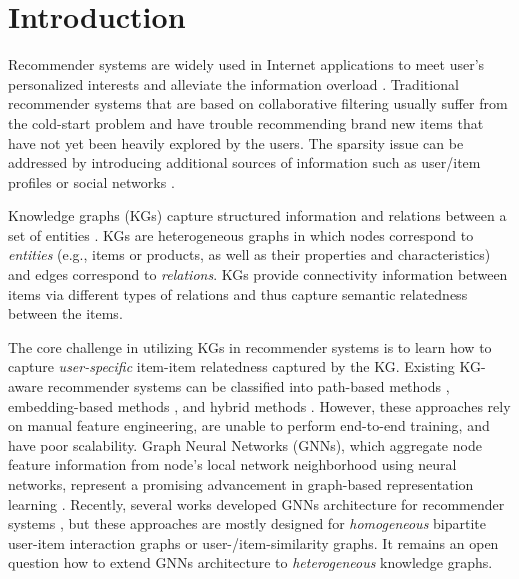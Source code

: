 \documentclass[sigconf]{acmart}
\begin{document}

\maketitle

\section{Introduction}
    Recommender systems are widely used in Internet applications to meet user's personalized interests and alleviate the information overload \cite{covington2016deep, wang2018billion, ying2018graph}.
	Traditional recommender systems that are based on collaborative filtering \cite{koren2009matrix,wang2017joint} usually suffer from the cold-start problem and have trouble recommending brand new items that have not yet been heavily explored by the users.
	The sparsity issue can be addressed by introducing additional sources of information such as user/item profiles \cite{wang2018shine} or social networks \cite{wang2017joint}.
	
	Knowledge graphs (KGs) capture structured information and relations between a set of entities \cite{zhang2016collaborative,wang2018dkn,huang2018improving,yu2014personalized,zhao2017meta,hu2018leveraging,wang2018ripple,sun2018recurrent,wang2019multi,wang2019knowledge,wang2019exploring}.
	KGs are heterogeneous graphs in which nodes correspond to \textit{entities} (e.g., items or products, as well as their properties and characteristics) and edges correspond to \textit{relations}.	KGs provide connectivity information between items via different types of relations and thus capture semantic relatedness between the items.
	
	The core challenge in utilizing KGs in recommender systems is to learn how to capture \textit{user-specific} item-item relatedness captured by the KG.
	Existing KG-aware recommender systems can be classified into path-based methods \cite{yu2014personalized,zhao2017meta,hu2018leveraging}, embedding-based methods \cite{zhang2016collaborative,wang2018dkn,huang2018improving,wang2019multi}, and hybrid methods \cite{wang2018ripple,sun2018recurrent,wang2019knowledge}.
	However, these approaches rely on manual feature engineering, are unable to perform end-to-end training, and have poor scalability.
	Graph Neural Networks (GNNs), which aggregate node feature information from node's local network neighborhood using neural networks, represent a promising advancement in graph-based representation learning \cite{bruna2014spectral,defferrard2016convolutional,kipf2017semi,duvenaud2015convolutional,niepert2016learning,hamilton2017inductive}.
	Recently, several works developed GNNs architecture for recommender systems \cite{ying2018graph,monti2017geometric,van2017graph,wu2018graph,wang2019knowledge}, but these approaches are mostly designed for \textit{homogeneous} bipartite user-item interaction graphs or user-/item-similarity graphs.
	It remains an open question how to extend GNNs architecture to \textit{heterogeneous} knowledge graphs.
\end{document}
